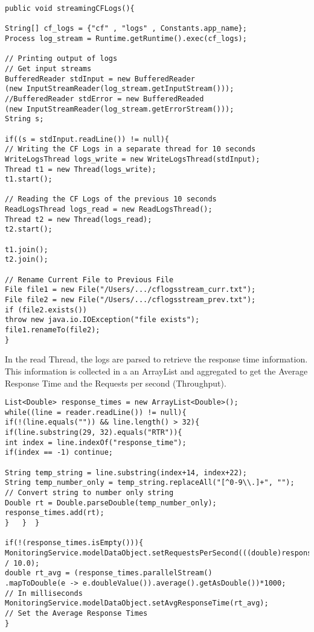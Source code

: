 \documentclass[article,type=msc,colorback,12pt,accentcolor=tud7b]{tudthesis}
\begin{document}
\begin{itemize}
\begin{lstlisting}
public void streamingCFLogs(){

String[] cf_logs = {"cf" , "logs" , Constants.app_name};
Process log_stream = Runtime.getRuntime().exec(cf_logs);

// Printing output of logs
// Get input streams
BufferedReader stdInput = new BufferedReader
(new InputStreamReader(log_stream.getInputStream()));
//BufferedReader stdError = new BufferedReaded
(new InputStreamReader(log_stream.getErrorStream()));
String s; 

if((s = stdInput.readLine()) != null){
// Writing the CF Logs in a separate thread for 10 seconds
WriteLogsThread logs_write = new WriteLogsThread(stdInput);
Thread t1 = new Thread(logs_write);
t1.start(); 

// Reading the CF Logs of the previous 10 seconds
ReadLogsThread logs_read = new ReadLogsThread();
Thread t2 = new Thread(logs_read);
t2.start();

t1.join();
t2.join();

// Rename Current File to Previous File
File file1 = new File("/Users/.../cflogsstream_curr.txt");
File file2 = new File("/Users/.../cflogsstream_prev.txt");
if (file2.exists())
throw new java.io.IOException("file exists");
file1.renameTo(file2);
}          
\end{lstlisting}

In the read Thread, the logs are parsed to retrieve the response time information. This information is collected in a an ArrayList and aggregated to get the Average Response Time and the Requests per second (Throughput). 
\begin{lstlisting}
List<Double> response_times = new ArrayList<Double>();
while((line = reader.readLine()) != null){				
if(!(line.equals("")) && line.length() > 32){
if(line.substring(29, 32).equals("RTR")){
int index = line.indexOf("response_time");
if(index == -1) continue;

String temp_string = line.substring(index+14, index+22);
String temp_number_only = temp_string.replaceAll("[^0-9\\.]+", "");		// Convert string to number only string
Double rt = Double.parseDouble(temp_number_only);
response_times.add(rt);	
}   }  }

if(!(response_times.isEmpty())){
MonitoringService.modelDataObject.setRequestsPerSecond(((double)response_times.size()) / 10.0);
double rt_avg = (response_times.parallelStream()
.mapToDouble(e -> e.doubleValue()).average().getAsDouble())*1000;		// In milliseconds
MonitoringService.modelDataObject.setAvgResponseTime(rt_avg);	 		// Set the Average Response Times  
}


\end{lstlisting}
\end{itemize}
\end{document}

